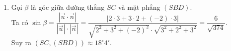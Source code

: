 \begin{bt}
{\begin{enumerate}
			Mặt phẳng $(SBD)$ có vectơ pháp tuyến $\overrightarrow{n}=(3;2;3)$, mặt đáy $(ABCD)$ có vectơ pháp tuyến $\overrightarrow{k}=(0;0;1)$. Gọi $\alpha$ là góc giữa mặt phẳng $(SBD)$ và mặt đáy.\\
			Ta có $\cos\alpha =\dfrac{\left |\overrightarrow{n}\cdot\overrightarrow{k} \right |}{\left |\overrightarrow{n} \right |\cdot\left |\overrightarrow{k} \right |}=\dfrac{\left |3\cdot 0+2\cdot 0+3\cdot 1 \right |}{\sqrt{3^2+2^2+3^2}\cdot\sqrt{0^2+0^2+1^2}}=\dfrac{3}{\sqrt{22}}$.\\
			Suy ra $\left ((SBD),(ABCD) \right )\approx 50^{\circ}14'$.
			\item Gọi $\beta$ là góc giữa đường thẳng $SC$ và mặt phẳng $(SBD)$.\\
			Ta có $\sin\beta =\dfrac{\left |\overrightarrow{u}\cdot\overrightarrow{n} \right |}{\left |\overrightarrow{u} \right |\cdot\left |\overrightarrow{n} \right |}=\dfrac{\left |2\cdot 3+3\cdot 2+(-2)\cdot 3 \right |}{\sqrt{2^2+3^2+(-2)^2}\cdot\sqrt{3^2+2^2+3^2}}=\dfrac{6}{\sqrt{374}}$.\\
			Suy ra $\left (SC,(SBD) \right )\approx 18^{\circ}4'$.
		\end{enumerate}
	}
\end{bt}

